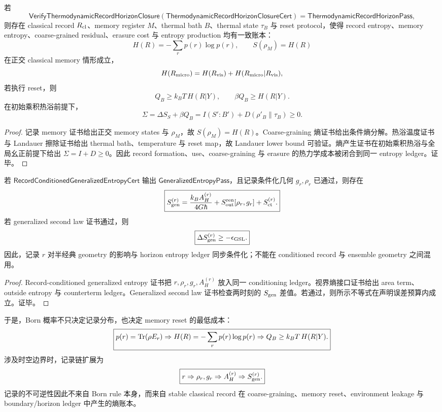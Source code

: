 \begin{theorem}[热力学记录闭包的可靠性]\label{thm:typed-address-biaxial-completion-thermodynamic-record-closure-soundness}
若
\[
\mathsf{VerifyThermodynamicRecordHorizonClosure}
(\mathsf{ThermodynamicRecordHorizonClosureCert})
=
\mathsf{ThermodynamicRecordHorizonPass},
\]
则存在 classical record \(R_{\rm cl}\)、memory register \(M\)、thermal bath \(B\)、thermal state \(\tau_B\) 与 reset protocol，使得 record entropy、memory entropy、coarse-grained residual、erasure cost 与 entropy production 均有一致账本：
\[
H(R)=-\sum_rp(r)\log p(r),
\qquad
S(\rho_M)=H(R)
\]
在正交 classical memory 情形成立，
\[
H(R_{\rm micro})
=
H(R_{\rm vis})+H(R_{\rm micro}|R_{\rm vis}),
\]
若执行 reset，则
\[
Q_B\ge k_BT\,H(R|Y),
\qquad
\beta Q_B\ge H(R|Y).
\]
在初始乘积热浴前提下，
\[
\Sigma
=
\Delta S_S+\beta Q_B
=
I(S':B')+D(\rho'_B\|\tau_B)
\ge0.
\]
\end{theorem}
\begin{proof}
记录 memory 证书给出正交 memory states 与 \(\rho_M\)，故 \(S(\rho_M)=H(R)\)。Coarse-graining 熵证书给出条件熵分解。热浴温度证书与 Landauer 擦除证书给出 thermal bath、temperature 与 reset map，故 Landauer lower bound 可验证。熵产生证书在初始乘积热浴与全局幺正前提下给出 \(\Sigma=I+D\ge0\)。因此 record formation、use、coarse-graining 与 erasure 的热力学成本被闭合到同一 entropy ledger。证毕。
\end{proof}

\begin{theorem}\label{thm:typed-address-biaxial-completion-record-conditioned-generalized-entropy-soundness}
若 \(\mathsf{RecordConditionedGeneralizedEntropyCert}\) 输出 \(\mathsf{GeneralizedEntropyPass}\)，且记录条件化几何 \(g_r,\rho_r\) 已通过，则存在
\[
\boxed{
S_{\rm gen}^{(r)}
=
\frac{k_BA_H^{(r)}}{4G\hbar}
+S_{\rm out}^{\rm ren}[\rho_r,g_r]
+S_{\rm ct}^{(r)}.
}
\]
若 generalized second law 证书通过，则
\[
\boxed{
\Delta S_{\rm gen}^{(r)}\ge-\epsilon_{\rm GSL}.
}
\]
因此，记录 \(r\) 对半经典 geometry 的影响与 horizon entropy ledger 同步条件化；不能在 conditioned record 与 ensemble geometry 之间混用。
\end{theorem}
\begin{proof}
Record-conditioned generalized entropy 证书把 \(r,\rho_r,g_r,A_H^{(r)}\) 放入同一 conditioning ledger。视界熵接口证书给出 area term、outside entropy 与 counterterm ledger。Generalized second law 证书检查两时刻的 \(S_{\rm gen}\) 差值。若通过，则所示不等式在声明误差预算内成立。证毕。
\end{proof}

于是，Born 概率不只决定记录分布，也决定 memory reset 的最低成本：
\[
\boxed{
p(r)={\rm Tr}(\rho E_r)
\Rightarrow
H(R)=-\sum_rp(r)\log p(r)
\Rightarrow
Q_B\ge k_BT\,H(R|Y).
}
\]
涉及时空边界时，记录链扩展为
\[
\boxed{
r
\Rightarrow
\rho_r,g_r
\Rightarrow
A_H^{(r)}
\Rightarrow
S_{\rm gen}^{(r)}.
}
\]
记录的不可逆性因此不来自 Born rule 本身，而来自 stable classical record 在 coarse-graining、memory reset、environment leakage 与 boundary/horizon ledger 中产生的熵账本。
